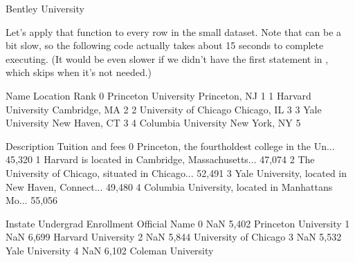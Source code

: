 \documentclass[letterpaper,10pt,english]{jupyterBook}
\begin{document}
\begin{sphinxVerbatim}[commandchars=\\\{\}]
\PYGZsq{}Bentley University\PYGZsq{}
\end{sphinxVerbatim}

\sphinxAtStartPar
Let’s apply that function to every row in the small dataset.  Note that  can be a bit slow, so the following code actually takes about 15 seconds to complete executing.  (It would be even slower if we didn’t have the first  statement in , which skips  when it’s not needed.)

\begin{sphinxVerbatim}[commandchars=\\\{\}]
\PYG{p}{[}\PYG{p}{]}  \PYG{p}{[}\PYG{p}{]}  
\end{sphinxVerbatim}

\begin{sphinxVerbatim}[commandchars=\\\{\}]
                    Name       Location  Rank  \PYGZbs{}
0   Princeton University  Princeton, NJ     1   
1     Harvard University  Cambridge, MA     2   
2  University of Chicago    Chicago, IL     3   
3        Yale University  New Haven, CT     3   
4    Columbia University   New York, NY     5   

                                         Description Tuition and fees  \PYGZbs{}
0  Princeton, the fourth\PYGZhy{}oldest college in the Un...         \PYGZdl{}45,320    
1  Harvard is located in Cambridge, Massachusetts...         \PYGZdl{}47,074    
2  The University of Chicago, situated in Chicago...         \PYGZdl{}52,491    
3  Yale University, located in New Haven, Connect...         \PYGZdl{}49,480    
4  Columbia University, located in Manhattan\PYGZsq{}s Mo...         \PYGZdl{}55,056    

  In\PYGZhy{}state Undergrad Enrollment          Official Name  
0      NaN                5,402   Princeton University  
1      NaN                6,699     Harvard University  
2      NaN                5,844  University of Chicago  
3      NaN                5,532        Yale University  
4      NaN                6,102     Coleman University  
\end{sphinxVerbatim}
\end{document}

